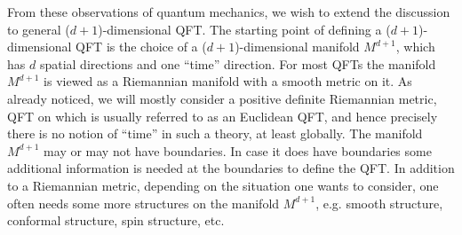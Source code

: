 From these observations of quantum mechanics, we wish to extend the
discussion to general ($d+1$)-dimensional QFT. The starting point
of defining a ($d+1$)-dimensional QFT is the choice of a ($d+1$)-dimensional
manifold $M^{d+1}$, which has $d$ spatial directions and one ``time''
direction. For most QFTs the manifold $M^{d+1}$ is viewed as a Riemannian
manifold with a smooth metric on it. As already noticed, we will mostly
consider a positive definite Riemannian metric, QFT on which is usually
referred to as an Euclidean QFT, and hence precisely there is no notion
of ``time'' in such a theory, at least globally. The manifold $M^{d+1}$
may or may not have boundaries. In case it does have boundaries some
additional information is needed at the boundaries to define the QFT.
In addition to a Riemannian metric, depending on the situation one
wants to consider, one often needs some more structures on the manifold
$M^{d+1}$, e.g. smooth structure, conformal structure, spin structure,
etc. 

